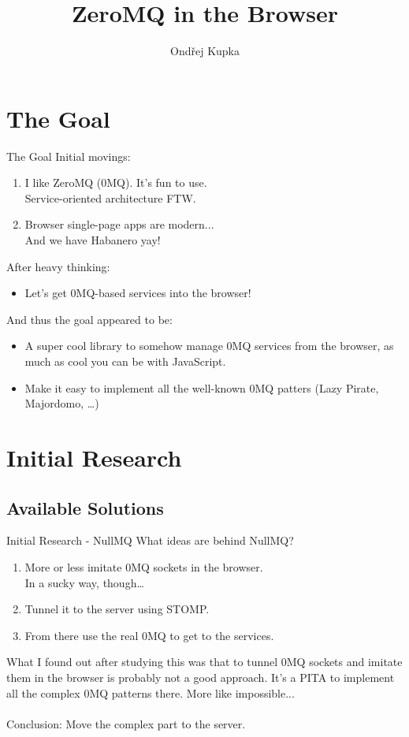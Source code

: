\documentclass{beamer}
\title{ZeroMQ in the Browser}
\author{Ondřej Kupka}
\begin{document}
\begin{frame}
\titlepage
\end{frame}

\section{The Goal}
\begin{frame}{The Goal}
  Initial movings:
  \begin{enumerate}
    \item I like ZeroMQ (0MQ). It's fun to use.\\Service-oriented architecture FTW.
	\item Browser single-page apps are modern...\\And we have Habanero yay!
  \end{enumerate}
  After heavy thinking:
  \begin{itemize}
    \item Let's get 0MQ-based services into the browser!
  \end{itemize}
  And thus the goal appeared to be:
  \begin{itemize}
    \item A super cool library to somehow manage 0MQ services from the browser,
	      as much as cool you can be with JavaScript.
	\item Make it easy to implement all the well-known 0MQ patters
	      (Lazy Pirate, Majordomo, \ldots)
  \end{itemize}
\end{frame}

\section{Initial Research}
\subsection{Available Solutions}
\begin{frame}{Initial Research - NullMQ}
  What ideas are behind NullMQ?
  \begin{enumerate}
    \item More or less imitate 0MQ sockets in the browser.\\
	      In a sucky way, though\ldots
	\item Tunnel it to the server using STOMP.
	\item From there use the real 0MQ to get to the services.
  \end{enumerate}
  What I found out after studying this was that to tunnel
  0MQ sockets and imitate them in the browser is probably not a good
  approach. It's a PITA to implement all the complex 0MQ patterns
  there. More like impossible...
  \\~\\
  Conclusion: Move the complex part to the server.
\end{frame}
\end{document}
